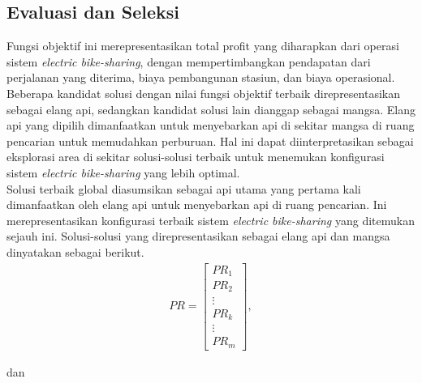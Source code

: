 \subsection{Evaluasi dan Seleksi}
Fungsi objektif ini merepresentasikan total profit yang diharapkan dari operasi sistem \textit{electric bike-sharing}, dengan mempertimbangkan pendapatan dari perjalanan yang diterima, biaya pembangunan stasiun, dan biaya operasional.\\

Beberapa kandidat solusi dengan nilai fungsi objektif terbaik direpresentasikan sebagai elang api, sedangkan kandidat solusi lain dianggap sebagai mangsa. Elang api yang dipilih dimanfaatkan untuk menyebarkan api di sekitar mangsa di ruang pencarian untuk memudahkan perburuan. Hal ini dapat diinterpretasikan sebagai eksplorasi area di sekitar solusi-solusi terbaik untuk menemukan konfigurasi sistem \textit{electric bike-sharing} yang lebih optimal.\\

Solusi terbaik global diasumsikan sebagai api utama yang pertama kali dimanfaatkan oleh elang api untuk menyebarkan api di ruang pencarian. Ini merepresentasikan konfigurasi terbaik sistem \textit{electric bike-sharing} yang ditemukan sejauh ini. Solusi-solusi yang direpresentasikan sebagai elang api dan mangsa dinyatakan sebagai berikut.
\begin{align}
    PR = \begin{bmatrix}
        PR_1\\
        PR_2\\
        \vdots\\
        PR_k\\
        \vdots\\
        PR_m
    \end{bmatrix},
\end{align}

dan

